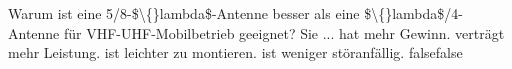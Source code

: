     {Warum ist eine 5/8-\$\textbackslash\{\}lambda\$-Antenne besser als eine \$\textbackslash\{\}lambda\$/4-Antenne für VHF-UHF-Mobilbetrieb geeignet? Sie ...}
    {hat mehr Gewinn.}
    {verträgt mehr Leistung.}
    {ist leichter zu montieren.}
    {ist weniger störanfällig.}
    {false}{false}